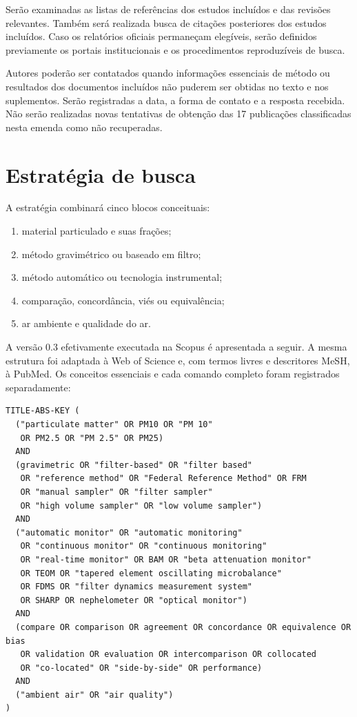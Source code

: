 \documentclass[11pt,a4paper]{article}
\begin{document}
Serão examinadas as listas de referências dos estudos incluídos e das revisões
relevantes. Também será realizada busca de citações posteriores dos estudos incluídos.
Caso os relatórios oficiais permaneçam elegíveis, serão definidos previamente os
portais institucionais e os procedimentos reproduzíveis de busca.

Autores poderão ser contatados quando informações essenciais de método ou resultados
dos documentos incluídos não puderem ser obtidas no texto e nos suplementos. Serão
registradas a data, a forma de contato e a resposta recebida. Não serão realizadas
novas tentativas de obtenção das 17 publicações classificadas nesta emenda como não
recuperadas.

\section{Estratégia de busca}

A estratégia combinará cinco blocos conceituais:

\begin{enumerate}
  \item material particulado e suas frações;
  \item método gravimétrico ou baseado em filtro;
  \item método automático ou tecnologia instrumental;
  \item comparação, concordância, viés ou equivalência;
  \item ar ambiente e qualidade do ar.
\end{enumerate}

A versão 0.3 efetivamente executada na Scopus é apresentada a seguir. A mesma estrutura
foi adaptada à Web of Science e, com termos livres e descritores MeSH, à PubMed. Os
conceitos essenciais e cada comando completo foram registrados separadamente:

\begin{verbatim}
TITLE-ABS-KEY (
  ("particulate matter" OR PM10 OR "PM 10"
   OR PM2.5 OR "PM 2.5" OR PM25)
  AND
  (gravimetric OR "filter-based" OR "filter based"
   OR "reference method" OR "Federal Reference Method" OR FRM
   OR "manual sampler" OR "filter sampler"
   OR "high volume sampler" OR "low volume sampler")
  AND
  ("automatic monitor" OR "automatic monitoring"
   OR "continuous monitor" OR "continuous monitoring"
   OR "real-time monitor" OR BAM OR "beta attenuation monitor"
   OR TEOM OR "tapered element oscillating microbalance"
   OR FDMS OR "filter dynamics measurement system"
   OR SHARP OR nephelometer OR "optical monitor")
  AND
  (compare OR comparison OR agreement OR concordance OR equivalence OR bias
   OR validation OR evaluation OR intercomparison OR collocated
   OR "co-located" OR "side-by-side" OR performance)
  AND
  ("ambient air" OR "air quality")
)
\end{verbatim}
\end{document}
